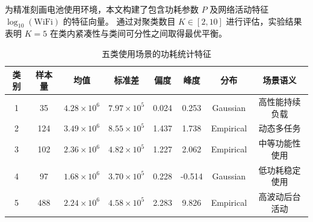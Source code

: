 \documentclass[11pt]{article}
\begin{document}
为精准刻画电池使用环境，本文构建了包含功耗参数 $P$
及网络活动特征 $\log_{10}(\mathrm{WiFi})$ 的特征向量。
通过对聚类数目 $K \in [2,10]$ 进行评估，实验结果表明 $K=5$
在类内紧凑性与类间可分性之间取得最优平衡。

\begin{table}[htbp]
\centering
\caption{不同聚类场景下的关键特征参数均值对比 ($K=5$)}
\label{tab:cluster_features_mean}
\end{table}

\begin{table}[htbp]
\centering
\caption{五类使用场景的功耗统计特征}
\label{tab:cluster_stats}
\renewcommand{\arraystretch}{1.3}
\begin{tabular}{cccccccc}
\hline
\textbf{类别} & \textbf{样本量} & \textbf{均值} & \textbf{标准差} & \textbf{偏度} & \textbf{峰度} & \textbf{分布} & \textbf{场景语义} \\ \hline
1 & 35 & $4.28\times10^6$ & $7.97\times10^5$ & 0.024 & 0.253 & Gaussian & 高性能持续负载 \\
2 & 124 & $3.49\times10^6$ & $8.55\times10^5$ & 1.437 & 1.738 & Empirical & 动态多任务 \\
3 & 102 & $2.36\times10^6$ & $4.82\times10^5$ & 1.227 & 2.062 & Empirical & 中等功能性使用 \\
4 & 97 & $1.68\times10^6$ & $3.70\times10^5$ & 0.228 & -0.514 & Gaussian & 低功耗稳定使用 \\
5 & 488 & $2.24\times10^6$ & $4.58\times10^5$ & 2.283 & 9.826 & Empirical & 高波动后台活动 \\ \hline
\end{tabular}
\end{table}
\end{document}
